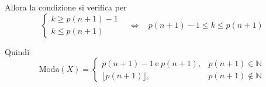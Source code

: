 \begin{enumerate}
Allora la condizione si verifica per\begin{equation*}
\begin{cases}
k\geq p( n+1) -1\\
k\leq p( n+1)
\end{cases} \ \ \ \ \iff \ \ \ \ p( n+1) -1\leq k\leq p( n+1)
\end{equation*}

Quindi\begin{equation*}
\text{Moda}( X) =\begin{cases}
p( n+1) -1\ \text{e} \ p( n+1) , & p( n+1) \in \mathbb{N}\\
\lfloor p( n+1)\rfloor , & p( n+1) \notin \mathbb{N}
\end{cases}
\end{equation*}
\end{enumerate}
\Soluzione

